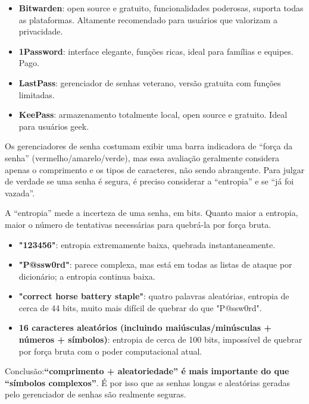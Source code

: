 
\begin{itemize}
  \item \textbf{Bitwarden}: open source e gratuito, funcionalidades poderosas, suporta todas as plataformas. Altamente recomendado para usuários que valorizam a privacidade.
  \item \textbf{1Password}: interface elegante, funções ricas, ideal para famílias e equipes. Pago.
  \item \textbf{LastPass}: gerenciador de senhas veterano, versão gratuita com funções limitadas.
  \item \textbf{KeePass}: armazenamento totalmente local, open source e gratuito. Ideal para usuários geek.
\end{itemize}


Os gerenciadores de senha costumam exibir uma barra indicadora de “força da senha” (vermelho/amarelo/verde), mas essa avaliação geralmente considera apenas o comprimento e os tipos de caracteres, não sendo abrangente. Para julgar de verdade se uma senha é segura, é preciso considerar a “entropia” e se “já foi vazada”.


A “entropia” mede a incerteza de uma senha, em bits. Quanto maior a entropia, maior o número de tentativas necessárias para quebrá-la por força bruta.

\begin{itemize}
  \item \textbf{"123456"}: entropia extremamente baixa, quebrada instantaneamente.
  \item \textbf{"P@ssw0rd"}: parece complexa, mas está em todas as listas de ataque por dicionário; a entropia continua baixa.
  \item \textbf{"correct horse battery staple"}: quatro palavras aleatórias, entropia de cerca de 44 bits, muito mais difícil de quebrar do que "P@ssw0rd".
  \item \textbf{16 caracteres aleatórios (incluindo maiúsculas/minúsculas + números + símbolos)}: entropia de cerca de 100 bits, impossível de quebrar por força bruta com o poder computacional atual.
\end{itemize}

Conclusão:\textbf{“comprimento + aleatoriedade” é mais importante do que “símbolos complexos”}. É por isso que as senhas longas e aleatórias geradas pelo gerenciador de senhas são realmente seguras.

